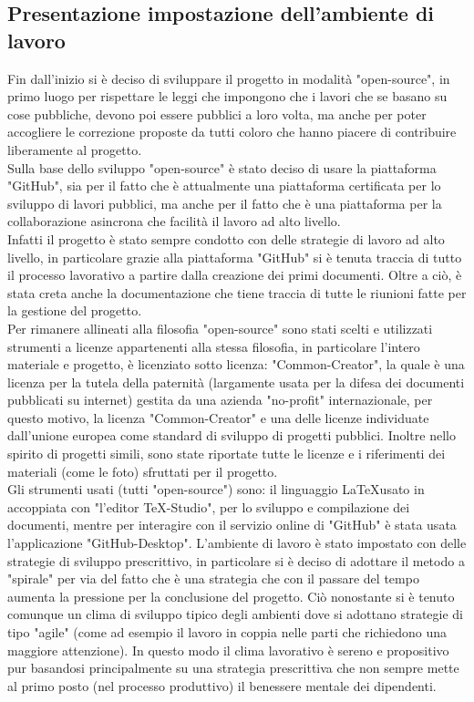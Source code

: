 \documentclass[hidelinks,12pt,a4paper]{article}
\begin{document}
\begin{flushleft}
			\subsection{Presentazione impostazione dell'ambiente di lavoro}
			Fin dall'inizio si è deciso di sviluppare il progetto in modalità "open-source", in primo luogo per rispettare le leggi che impongono che i lavori che se basano su cose pubbliche, devono poi essere pubblici a loro volta, ma anche per poter accogliere le correzione proposte da tutti coloro che hanno piacere di contribuire liberamente al progetto.\\
			Sulla base dello sviluppo "open-source" è stato deciso di usare la piattaforma "GitHub", sia per il fatto che è attualmente una piattaforma certificata per lo sviluppo di lavori pubblici, ma anche per il fatto che è una piattaforma per la collaborazione asincrona che facilità il lavoro ad alto livello.\\
			Infatti il progetto è stato sempre condotto con delle strategie di lavoro ad alto livello, in particolare grazie alla piattaforma "GitHub" si è tenuta traccia di tutto il processo lavorativo a partire dalla creazione dei primi documenti. Oltre a ciò, è stata creta anche la documentazione che tiene traccia di tutte le riunioni fatte per la gestione del progetto.\\
			Per rimanere allineati alla filosofia "open-source" sono stati scelti e utilizzati strumenti a licenze appartenenti alla stessa filosofia, in particolare l'intero materiale e progetto, è licenziato sotto licenza: "Common-Creator", la quale è una licenza per la tutela della paternità (largamente usata per la difesa dei documenti pubblicati su internet) gestita da una azienda "no-profit"  internazionale, per questo motivo, la licenza "Common-Creator" e una delle licenze individuate dall'unione europea come standard di sviluppo di progetti pubblici. Inoltre nello spirito di progetti simili, sono state riportate tutte le licenze e i riferimenti dei materiali (come le foto) sfruttati per il progetto.\\
			Gli strumenti usati (tutti "open-source") sono: il linguaggio \LaTeX usato in accoppiata con "l'editor TeX-Studio", per lo sviluppo e compilazione dei documenti, mentre per interagire con il servizio online di "GitHub" è stata usata l'applicazione "GitHub-Desktop".
			\bigskip
			L'ambiente di lavoro è stato impostato con delle strategie di sviluppo prescrittivo, in particolare  si è deciso di adottare il metodo a "spirale" per via del fatto che è una strategia che con il passare del tempo aumenta la pressione per la conclusione del progetto. Ciò nonostante si è tenuto comunque un clima di sviluppo tipico degli ambienti dove si adottano strategie di tipo "agile" (come ad esempio il lavoro in coppia nelle parti che richiedono una maggiore attenzione). In questo modo il clima lavorativo è sereno e propositivo pur basandosi principalmente su una strategia prescrittiva che non sempre mette al primo posto (nel processo produttivo) il benessere mentale dei dipendenti. 
			

\end{flushleft}
\end{document}

